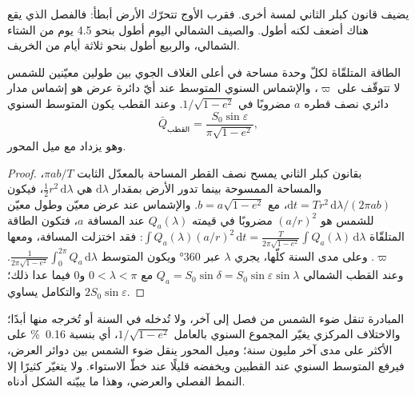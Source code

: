 يضيف قانون كبلر الثاني لمسة أخرى. فقرب الأوج تتحرّك الأرض أبطأ: فالفصل الذي يقع
هناك أضعف لكنه أطول. والصيف الشمالي اليوم أطول بنحو 4.5 يوم من الشتاء
الشمالي، والربيع أطول بنحو ثلاثة أيام من الخريف.

\begin{proposition}\label{prop:b2:orbital-forcing:annual}
الطاقة المتلقّاة لكلّ وحدة مساحة في أعلى الغلاف الجوي بين طولين معيّنين
للشمس لا تتوقّف على $\varpi$، والإشماس السنوي المتوسط عند أيّ دائرة عرض هو إشماس
مدار دائري نصف قطره $a$ مضروبًا في $1/\sqrt{1 - e^2}$. وعند القطب يكون المتوسط السنوي
\[
  \bar Q_{\text{القطب}} = \frac{S_0\sin\varepsilon}{\pi\sqrt{1 - e^2}} ,
\]
وهو يزداد مع ميل المحور.
\end{proposition}

\begin{proof}
بقانون كبلر الثاني يمسح نصف القطر المساحة بالمعدّل الثابت $\pi ab/T$، والمساحة الممسوحة
بينما تدور الأرض بمقدار $\mathrm d\lambda$ هي $\frac12 r^2\,\mathrm d\lambda$، فيكون $\mathrm dt =
T r^2\,\mathrm d\lambda/(2\pi ab)$، مع $b = a\sqrt{1 - e^2}$. والإشماس عند عرض معيّن
وطول معيّن للشمس هو $(a/r)^2$ مضروبًا في قيمته $Q_a(\lambda)$ عند المسافة $a$، فتكون
الطاقة المتلقّاة $\int Q_a(\lambda)(a/r)^2\,\mathrm dt = \frac{T}{2\pi\sqrt{1 - e^2}}\int
Q_a(\lambda)\,\mathrm d\lambda$: فقد اختزلت المسافة، ومعها $\varpi$. وعلى مدى السنة
كلّها، يجري $\lambda$ عبر \ang{360} ويكون المتوسط $\frac{1}{2\pi\sqrt{1-e^2}}\int_0^{2\pi}
Q_a\,\mathrm d\lambda$. وعند القطب الشمالي $Q_a = S_0\sin\delta = S_0\sin\varepsilon\sin\lambda$
مع $0 < \lambda < \pi$ و0 فيما عدا ذلك؛ والتكامل يساوي $2S_0\sin\varepsilon$.
\end{proof}

المبادرة تنقل ضوء الشمس من فصل إلى آخر، ولا تُدخله في السنة أو تُخرجه منها أبدًا؛ والاختلاف المركزي
يغيّر المجموع السنوي بالعامل $1/\sqrt{1 - e^2}$، أي بنسبة \qty{0.16}{\percent} على الأكثر على مدى
آخر مليون سنة؛ وميل المحور ينقل ضوء الشمس بين دوائر العرض، فيرفع المتوسط السنوي عند
القطبين ويخفضه قليلًا عند خطّ الاستواء. ولا يتغيّر كثيرًا إلا النمط الفصلي والعرضي،
وهذا ما يبيّنه الشكل أدناه.

